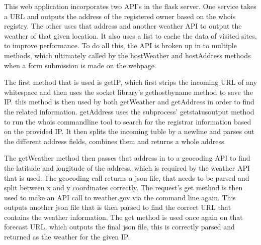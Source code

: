 	This web application incorporates two API's in the flask server. One service takes a URL and outputs the address of the registered owner based on the whois registry. The other uses that address and another weather API to output the weather of that given location. It also uses a list to cache the data of visited sites, to improve performance. To do all this, the API is broken up in to multiple methods, which ultimately called by the hostWeather and hostAddress methods when a form submission is made on the webpage.
	
	The first method that is used is getIP, which first strips the incoming URL of any whitespace and then uses the socket library's gethostbyname method to save the IP. this method is then used by both getWeather and getAddress in order to find the related information. getAddress uses the subprocess' getstatusoutput method to run the whois commandline tool to search for the registrar information based on the provided IP. It then splits the incoming tuble by a newline and parses out the different address fields, combines them and returns a whole address. 
	
	The getWeather method then passes that address in to a geocoding API to find the latitude and longitude of the address, which is required by the weather API that is used. The geocoding call returns a json file, that needs to be parsed and split between x and y coordinates correctly. The request's get method is then used to make an API call to weather.gov \cite{weather2009national} via the command line again. This outputs another json file that is then parsed to find the correct URL that contains the weather information. The get method is used once again on that forecast URL, which outputs the final json file, this is correctly parsed and returned as the weather for the given IP.
	 
